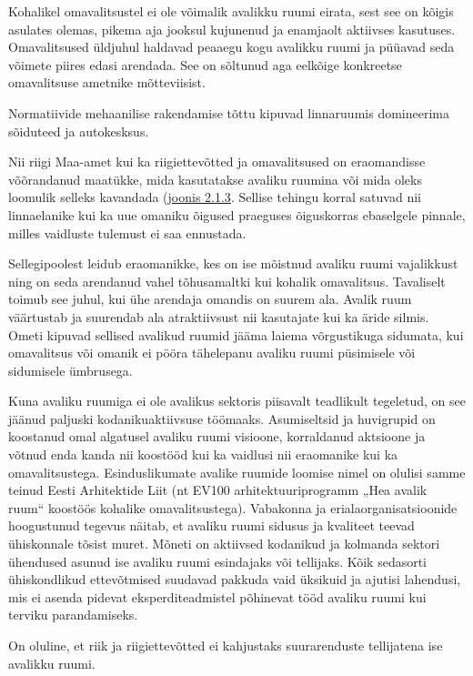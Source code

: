 \documentclass[estonian,]{article}
\begin{document}
Kohalikel omavalitsustel ei ole võimalik avalikku ruumi eirata, sest see on kõigis asulates olemas, pikema aja jooksul kujunenud ja enamjaolt aktiivses kasutuses. Omavalitsused üldjuhul haldavad peaaegu kogu avalikku ruumi ja püüavad seda võimete piires edasi arendada. See on sõltunud aga eelkõige konkreetse omavalitsuse ametnike mõtteviisist.

\begin{blockquote-left}
Normatiivide mehaanilise rakendamise tõttu kipuvad linnaruumis
domineerima sõiduteed ja autokesksus.
\end{blockquote-left}

Nii riigi Maa-amet kui ka riigiettevõtted ja omavalitsused on eraomandisse võõrandanud maatükke, mida kasutatakse avaliku ruumina või mida oleks loomulik selleks kavandada (\protect\hyperlink{figure213}{joonis 2.1.3}. Sellise tehingu korral satuvad nii linnaelanike kui ka uue omaniku õigused praeguses õiguskorras ebaselgele pinnale, milles vaidluste tulemust ei saa ennustada.

Sellegipoolest leidub eraomanikke, kes on ise mõistnud avaliku ruumi vajalikkust ning on seda arendanud vahel tõhusamaltki kui kohalik omavalitsus. Tavaliselt toimub see juhul, kui ühe arendaja omandis on suurem ala. Avalik ruum väärtustab ja suurendab ala atraktiivsust nii kasutajate kui ka äride silmis. Ometi kipuvad sellised avalikud ruumid jääma laiema võrgustikuga sidumata, kui omavalitsus või omanik ei pööra tähelepanu avaliku ruumi püsimisele või sidumisele ümbrusega.

Kuna avaliku ruumiga ei ole avalikus sektoris piisavalt teadlikult tegeletud, on see jäänud paljuski kodanikuaktiivsuse töömaaks. Asumiseltsid ja huvigrupid on koostanud omal algatusel avaliku ruumi visioone, korraldanud aktsioone ja võtnud enda kanda nii koostööd kui ka vaidlusi nii eraomanike kui ka omavalitsustega. Esinduslikumate avalike ruumide loomise nimel on olulisi samme teinud Eesti Arhitektide Liit (nt EV100 arhitektuuriprogramm „Hea avalik ruum`` koostöös kohalike omavalitsustega). Vabakonna ja erialaorganisatsioonide hoogustunud tegevus näitab, et avaliku ruumi sidusus ja kvaliteet teevad ühiskonnale tõsist muret. Mõneti on aktiivsed kodanikud ja kolmanda sektori ühendused asunud ise avaliku ruumi esindajaks või tellijaks. Kõik sedasorti ühiskondlikud ettevõtmised suudavad pakkuda vaid üksikuid ja ajutisi lahendusi, mis ei asenda pidevat eksperditeadmistel põhinevat tööd avaliku ruumi kui terviku parandamiseks.

\begin{blockquote-right}
On oluline, et riik ja riigiettevõtted ei kahjustaks suurarenduste
tellijatena ise avalikku ruumi.
\end{blockquote-right}
\end{document}
